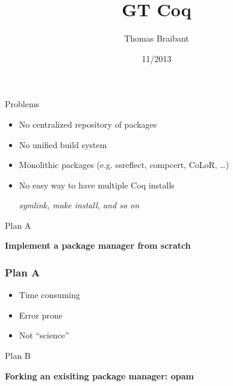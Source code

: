 \documentclass[9pt]{beamer}
\title{GT Coq}
\author{Thomas Braibant}
\institute[Inria]{Inria}
\date[11/2013]{11/2013}
\newcommand{\redemph}[1]{\alert{\emph{#1}}}
\begin{document}
\newcommand \orange[1]{{\color{orange}{#1}}}

\newcommand\parenthesis[1] {
  \begin{flushright}
    {\scriptsize \redemph{{{{ #1}}}}}
  \end{flushright}

}

\newcommand\plan[2]
{
\begin{frame}[plain]
  \begin{center}
    {\Huge  \sc #1} \\

    \vspace{1cm}

    #2
\end{center}
\end{frame}
}

\begin{frame}
  \center 
  \titlepage
\end{frame} 

\begin{frame}{Problems}
  \begin{itemize}
  \item No centralized repository of packages
  \item No unified build system
  \item Monolithic packages (e.g. ssreflect, compcert, CoLoR, \dots)
  \item No easy way to have multiple Coq installs \\
    \parenthesis{symlink, make install, and so on}
  \end{itemize}
\end{frame}


\plan{Plan A}{\textbf{Implement a package manager from scratch}}

\begin{frame}
  \frametitle{Plan A}
  \begin{itemize}
  \item Time consuming
  \item Error prone
  \item Not ``science''
  \end{itemize}
\end{frame}

\plan{Plan B}{\textbf{Forking an exisiting package manager: opam}}
\end{document}
